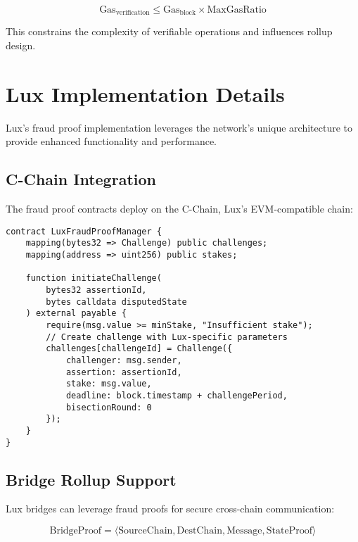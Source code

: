 \documentclass[11pt,a4paper]{article}
\theoremstyle{definition}
\begin{document}
\begin{equation}
\text{Gas}_{\text{verification}} \leq \text{Gas}_{\text{block}} \times \text{MaxGasRatio}
\end{equation}

This constrains the complexity of verifiable operations and influences rollup design.

\section{Lux Implementation Details}

Lux's fraud proof implementation leverages the network's unique architecture to provide enhanced functionality and performance.

\subsection{C-Chain Integration}

The fraud proof contracts deploy on the C-Chain, Lux's EVM-compatible chain:

\begin{lstlisting}[language=Solidity, caption=Lux Fraud Proof Manager]
contract LuxFraudProofManager {
    mapping(bytes32 => Challenge) public challenges;
    mapping(address => uint256) public stakes;
    
    function initiateChallenge(
        bytes32 assertionId,
        bytes calldata disputedState
    ) external payable {
        require(msg.value >= minStake, "Insufficient stake");
        // Create challenge with Lux-specific parameters
        challenges[challengeId] = Challenge({
            challenger: msg.sender,
            assertion: assertionId,
            stake: msg.value,
            deadline: block.timestamp + challengePeriod,
            bisectionRound: 0
        });
    }
}
\end{lstlisting}

\subsection{Bridge Rollup Support}

Lux bridges can leverage fraud proofs for secure cross-chain communication:

\begin{equation}
\text{BridgeProof} = \langle \text{SourceChain}, \text{DestChain}, \text{Message}, \text{StateProof} \rangle
\end{equation}
\end{document}
